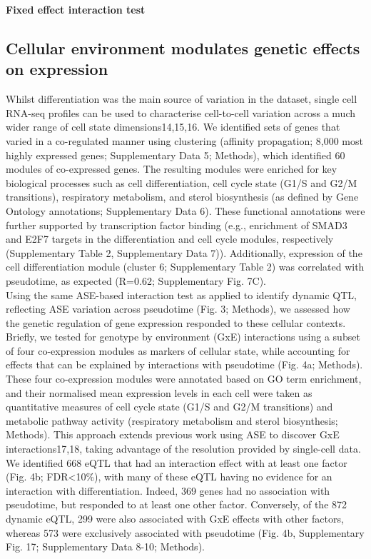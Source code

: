 \vspace{5mm}

\textbf{Fixed effect interaction test}



\subsection{Cellular environment modulates genetic effects on expression}

Whilst differentiation was the main source of variation in the dataset, single cell RNA-seq profiles can be used to characterise cell-to-cell variation across a much wider range of cell state dimensions14,15,16. 
We identified sets of genes that varied in a co-regulated manner using clustering (affinity propagation; 8,000 most highly expressed genes; Supplementary Data 5; Methods), which identified 60 modules of co-expressed genes. 
The resulting modules were enriched for key biological processes such as cell differentiation, cell cycle state (G1/S and G2/M transitions), respiratory metabolism, and sterol biosynthesis (as defined by Gene Ontology annotations; Supplementary Data 6). 
These functional annotations were further supported by transcription factor binding (e.g., enrichment of SMAD3 and E2F7 targets in the differentiation and cell cycle modules, respectively (Supplementary Table 2, Supplementary Data 7)). 
Additionally, expression of the cell differentiation module (cluster 6; Supplementary Table 2) was correlated with pseudotime, as expected (R=0.62; Supplementary Fig. 7C).\\

Using the same ASE-based interaction test as applied to identify dynamic QTL, reflecting ASE variation across pseudotime (Fig. 3; Methods), we assessed how the genetic regulation of gene expression responded to these cellular contexts. 
Briefly, we tested for genotype by environment (GxE) interactions using a subset of four co-expression modules as markers of cellular state, while accounting for effects that can be explained by interactions with pseudotime (Fig. 4a; Methods). 
These four co-expression modules were annotated based on GO term enrichment, and their normalised mean expression levels in each cell were taken as quantitative measures of cell cycle state (G1/S and G2/M transitions) and metabolic pathway activity (respiratory metabolism and sterol biosynthesis; Methods). 
This approach extends previous work using ASE to discover GxE interactions17,18, taking advantage of the resolution provided by single-cell data. 
We identified 668 eQTL that had an interaction effect with at least one factor (Fig. 4b; FDR<10\%), with many of these eQTL having no evidence for an interaction with differentiation.
Indeed, 369 genes had no association with pseudotime, but responded to at least one other factor. 
Conversely, of the 872 dynamic eQTL, 299 were also associated with GxE effects with other factors, whereas 573 were exclusively associated with pseudotime (Fig. 4b, Supplementary Fig. 17; Supplementary Data 8-10; Methods).\\

